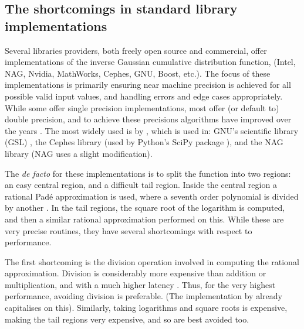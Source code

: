 \documentclass[manuscript,review]{acmart}
\begin{document}
\subsection{The shortcomings in standard library implementations}

Several libraries providers, both freely open source and commercial, offer implementations of the inverse Gaussian cumulative distribution function, (Intel, NAG, Nvidia, MathWorks, Cephes, GNU, Boost, etc.). The focus of these implementations is primarily ensuring near machine precision is achieved for all possible valid input values, and handling errors and edge cases appropriately. While some offer single precision implementations, most offer (or default to) double precision, and to achieve these precisions algorithms have improved over the years \citep{hastings1955approximations,evans1974algorithm70,beasley1985percentage,wichura1988algorithm,marsaglia1994rapid,giles2011approximating}. The most widely used is by \citet{wichura1988algorithm}, which is used in: GNU's scientific library (GSL) \citep{galassi2017gsl}, the Cephes library \citep{moshier1992cephes} (used by Python's SciPy package \citep{scipy2020scipy}), and the NAG library \citep{nag2017mark26} (NAG uses a slight modification). 

The \textit{de facto} for these implementations is to split the function into two regions: an easy central region, and a difficult tail region. Inside the central region a rational Pad\'{e} approximation is used, where a seventh order polynomial is divided by another \citep{wichura1988algorithm}. In the tail regions, the square root of the logarithm is computed, and then a similar rational approximation performed on this. While these are very precise routines, they have several shortcomings with respect to performance.

The first shortcoming is the division operation involved in computing the rational approximation. Division is considerably more expensive than addition or multiplication, and with a much higher latency \citep{wittmann2015short,fog2018instruction}. Thus, for the very highest performance, avoiding division is preferable. (The implementation by \citet{giles2011approximating} already capitalises on this). Similarly, taking logarithms and square roots is expensive, making the tail regions very expensive, and so are best avoided too. 
\end{document}
